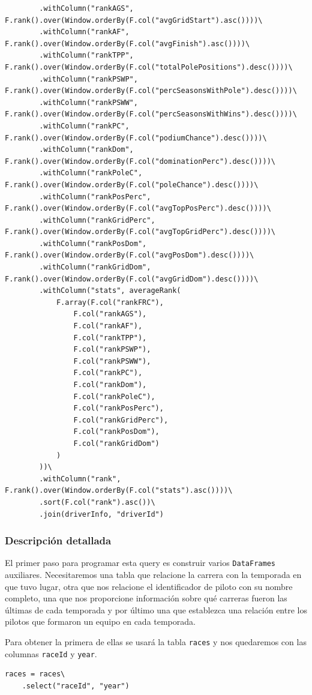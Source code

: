 \documentclass[12pt,twoside,titlepage]{report}
\begin{document}
\begin{lstlisting}
		.withColumn("rankAGS", F.rank().over(Window.orderBy(F.col("avgGridStart").asc())))\
		.withColumn("rankAF", F.rank().over(Window.orderBy(F.col("avgFinish").asc())))\
		.withColumn("rankTPP", F.rank().over(Window.orderBy(F.col("totalPolePositions").desc())))\
		.withColumn("rankPSWP", F.rank().over(Window.orderBy(F.col("percSeasonsWithPole").desc())))\
		.withColumn("rankPSWW", F.rank().over(Window.orderBy(F.col("percSeasonsWithWins").desc())))\
		.withColumn("rankPC", F.rank().over(Window.orderBy(F.col("podiumChance").desc())))\
		.withColumn("rankDom", F.rank().over(Window.orderBy(F.col("dominationPerc").desc())))\
		.withColumn("rankPoleC", F.rank().over(Window.orderBy(F.col("poleChance").desc())))\
		.withColumn("rankPosPerc", F.rank().over(Window.orderBy(F.col("avgTopPosPerc").desc())))\
		.withColumn("rankGridPerc", F.rank().over(Window.orderBy(F.col("avgTopGridPerc").desc())))\
		.withColumn("rankPosDom", F.rank().over(Window.orderBy(F.col("avgPosDom").desc())))\
		.withColumn("rankGridDom", F.rank().over(Window.orderBy(F.col("avgGridDom").desc())))\
		.withColumn("stats", averageRank(
			F.array(F.col("rankFRC"),
				F.col("rankAGS"),
				F.col("rankAF"),
				F.col("rankTPP"),
				F.col("rankPSWP"),
				F.col("rankPSWW"),
				F.col("rankPC"),
				F.col("rankDom"),
				F.col("rankPoleC"),
				F.col("rankPosPerc"),
				F.col("rankGridPerc"),
				F.col("rankPosDom"),
				F.col("rankGridDom")
			)
		))\
		.withColumn("rank", F.rank().over(Window.orderBy(F.col("stats").asc())))\
		.sort(F.col("rank").asc())\
		.join(driverInfo, "driverId")
\end{lstlisting}

\subsubsection{Descripción detallada}

El primer paso para programar esta query es construir varios \texttt{DataFrames} auxiliares. Necesitaremos una tabla que relacione la carrera con la temporada en que tuvo lugar,  otra que nos relacione el identificador de piloto con su nombre completo, una que nos proporcione información sobre qué carreras fueron las últimas de cada temporada y por último una que establezca una relación entre los pilotos que formaron un equipo en cada temporada.

Para obtener la primera de ellas se usará la tabla \texttt{races} y nos quedaremos con las columnas \texttt{raceId} y \texttt{year}. 

\begin{lstlisting}
races = races\
	.select("raceId", "year")
\end{lstlisting}
\end{document}
